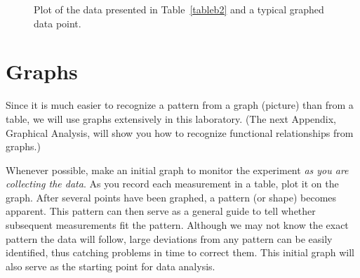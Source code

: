 \begin{figure}    %
\begin{center}
{}\hfill
{}
\end{center}
\caption{Plot of the data presented in Table~\protect\ref{tableb2} and
a typical graphed data point.  \label{fig:b1}}
\end{figure}

\section*{Graphs}
     Since it is much easier to recognize a pattern from a graph
(picture) than from a table, we will use graphs extensively in
this laboratory.  (The next Appendix, Graphical Analysis, will show you how to
recognize functional relationships from graphs.)

     Whenever possible, make an initial graph to monitor the experiment {\em as
you are collecting the data}.  As you record each measurement in a table,  plot it
on the graph.  After several points have been graphed, a pattern
(or shape) becomes apparent.  This pattern can then serve as a
general guide to tell whether subsequent measurements fit the
pattern.  Although we may not know the exact pattern the data
will follow, large deviations from any pattern can be easily
identified, thus catching problems in time to correct them.
This initial graph will also serve as the starting point for data
analysis.

